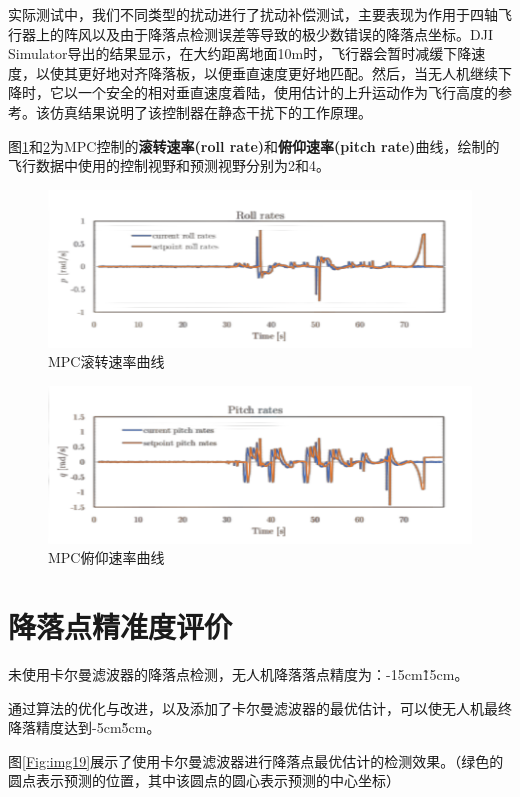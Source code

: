 实际测试中，我们不同类型的扰动进行了扰动补偿测试，主要表现为作用于四轴飞行器上的阵风以及由于降落点检测误差等导致的极少数错误的降落点坐标。DJI Simulator导出的结果显示，在大约距离地面10m时，飞行器会暂时减缓下降速度，以使其更好地对齐降落板，以便垂直速度更好地匹配。然后，当无人机继续下降时，它以一个安全的相对垂直速度着陆，使用估计的上升运动作为飞行高度的参考。该仿真结果说明了该控制器在静态干扰下的工作原理。

图\ref{Fig:img17}和\ref{Fig:img18}为MPC控制的\textbf{滚转速率(roll rate)}和\textbf{俯仰速率(pitch rate)}曲线，绘制的飞行数据中使用的控制视野和预测视野分别为2和4。

\begin{figure}[ht]
  \centering
  \includegraphics[width=0.8\linewidth]{./Figure/MPC-Roll-Rates.png}
  \caption{MPC滚转速率曲线}\label{Fig:img17}
\end{figure}

\begin{figure}[ht]
  \centering
  \includegraphics[width=0.8\linewidth]{./Figure/MPC-Pitch-Rates.png}
  \caption{MPC俯仰速率曲线}\label{Fig:img18}
\end{figure}

\section{降落点精准度评价}

未使用卡尔曼滤波器的降落点检测，无人机降落落点精度为：-15cm\~15cm。

通过算法的优化与改进，以及添加了卡尔曼滤波器的最优估计，可以使无人机最终降落精度达到-5cm\~5cm。

图\ref{Fig:img19}展示了使用卡尔曼滤波器进行降落点最优估计的检测效果。（绿色的圆点表示预测的位置，其中该圆点的圆心表示预测的中心坐标）

